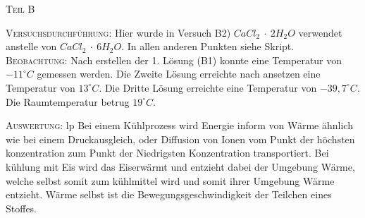 \documentclass[11pt, a4paper]{article}
\begin{document}
\begin{center}
\textsc{Teil B}
\end{center}

\textsc{Versuchsdurchführung:} Hier wurde in Versuch B2) $CaCl_2\ \cdot\ 2H_2O$ verwendet anstelle von $CaCl_2\ \cdot\ 6H_2O$. In allen anderen Punkten siehe Skript.\\

\textsc{Beobachtung:}\hspace{5mm} Nach erstellen der 1. Lösung (B1) konnte eine Temperatur von $-11^\circ C$ gemessen werden. Die Zweite Lösung erreichte nach ansetzen eine Temperatur von $13^\circ C$. Die Dritte Lösung erreichte eine Temperatur von $-39,7^\circ C$. Die Raumtemperatur betrug $19^\circ C$.

\textsc{Auswertung:}\hspace{8mm} lp
Bei einem Kühlprozess wird Energie inform von Wärme ähnlich wie bei einem Druckausgleich, oder Diffusion von Ionen vom Punkt der höchsten konzentration zum Punkt der Niedrigsten Konzentration transportiert. Bei kühlung mit Eis wird das Eiserwärmt und entzieht dabei der Umgebung Wärme, welche selbst somit zum kühlmittel wird und somit ihrer Umgebung Wärme entzieht. Wärme selbst ist die Bewegungsgeschwindigkeit der Teilchen eines Stoffes.
\end{document}
